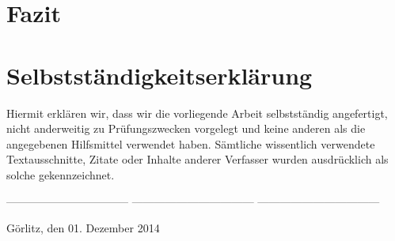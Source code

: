 \documentclass[
    11pt,               %
    a4paper,            %
    headsepline,        %
    foodsepline,        %
    cleardoubleplain,   %
    liststotoc,         %
    bibtotoc,           %
]%
{article}
\begin{document}
\section{Fazit}

\renewcommand{\baselinestretch}{1.13}\normalsize
{}
\renewcommand{\bibname}{BIBLIOGRAPHY}


\cleardoublepage

\section*{Selbstständigkeitserklärung}
\thispagestyle{empty} Hiermit erklären wir, dass wir die vorliegende
Arbeit selbstständig angefertigt, nicht anderweitig zu
Prüfungszwecken vorgelegt und keine anderen als die angegebenen
Hilfsmittel verwendet haben. Sämtliche wissentlich verwendete
Textausschnitte, Zitate oder Inhalte anderer Verfasser
wurden ausdrücklich als solche gekennzeichnet.%

\vspace{2cm}\noindent
\vspace{1cm}\noindent
--------------------------------- \newline
\vspace{1cm}\noindent
--------------------------------- \newline
\vspace{1cm}\noindent
--------------------------------- \newline
\vspace{1cm}\noindent

Görlitz, den 01. Dezember 2014
\end{document}
